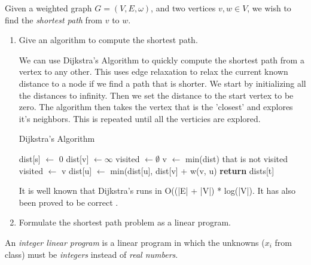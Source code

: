 \documentclass{article}
\begin{document}
\nextprob
Given a weighted graph $G=(V,E,\omega)$, and two vertices $v,w \in V$, we wish
to find the \emph{shortest path} from $v$ to $w$.

\begin{enumerate}
\item Give an algorithm to compute the shortest path.

We can use Dijkstra's Algorithm to quickly compute the shortest path from a vertex to any other. This uses edge relaxation to relax the current known distance to a node if we find a path that is shorter. We start by initializing all the distances to infinity. Then we set the distance to the start vertex to be zero. The algorithm then takes the vertex that is the 'closest' and explores it's neighbors. This is repeated until all the verticies are explored. 

\begin{algorithm}
\caption{Dijkstra's Algorithm}\label{guests}
\begin{algorithmic}[1]
	\State dist[s] $\gets$ 0
		\State dist[v] $\gets \infty$
	\EndFor
	\State visited $\gets \emptyset$
		\State v $\gets$ min(dist) that is not visited
		\State visited $\gets$ v
			\State dist[u] $\gets$ min(dist[u], dist[v] + w(v, u)
		\EndFor
	\EndWhile
	\State \textbf{return} dists[t]
\EndFunction
\end{algorithmic}
\end{algorithm}

It is well known that Dijkstra's runs in O((|E| + |V|) * log(|V|). It has also been proved to be correct \cite{Dijkstra}. 

\item Formulate the shortest path problem as a linear program.
\end{enumerate}





\nextprob
An \emph{integer linear program} is a linear program in which the unknowns
($x_i$ from class) must be \emph{integers} instead of \emph{real numbers}.
\end{document}

